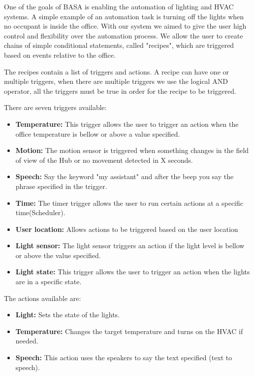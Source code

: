 \documentclass[conference]{IEEEtran}
\begin{document}
One of the goals of BASA is enabling the automation of lighting and \ac{HVAC} systems. A simple example of an automation task is turning off the lights when no occupant is inside the office.
With our system we aimed to give the user high control and flexibility over the automation process. We allow the user to create chains of simple conditional statements, called "recipes", which are triggered based on events relative to the office.

The recipes contain a list of triggers and actions. A recipe can have one or multiple triggers, when there are multiple triggers we use the logical AND operator, all the triggers must be true in order for the recipe to be triggered.

There are seven triggers available:

\begin{itemize}
  \item \textbf{Temperature:} This trigger allows the user to trigger an action when the office temperature is bellow or above a value specified.
  \item \textbf{Motion:} The motion sensor is triggered when something changes in the field of view of the Hub or no movement detected in X seconds.
  \item \textbf{Speech:} Say the keyword "my assistant" and after the beep you say the phrase specified in the trigger.  
  \item \textbf{Time:} The timer trigger allows the user to run certain actions at a specific time(Scheduler).  
  \item \textbf{User location:} Allows actions to be triggered based on the user location
  \item \textbf{Light sensor:} The light sensor triggers an action if the light level is bellow or above the value specified.
  \item \textbf{Light state:} This trigger allows the user to trigger an action when the lights are in a specific state.
  
\end{itemize}

The actions available are:

\begin{itemize}
  \item \textbf{Light:} Sets the state of the lights.
  \item \textbf{Temperature:} Changes the target temperature and turns on the HVAC if needed.
  \item \textbf{Speech:} This action uses the speakers to say the text specified (text to speech).
\end{itemize}
\end{document}
